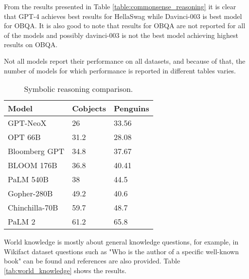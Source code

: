 \documentclass[conference]{IEEEtran}
\begin{document}
From the results presented in Table \ref{table:commonsense_reasoning} it is clear that GPT-4 achieves best results for HellaSwag while Davinci-003 is best model for OBQA. It is also good to note that results for OBQA are not reported for all of the models and possibly davinci-003 is not the best model achieving highest results on OBQA.

Not all models report their performance on all datasets, and because of that, the number of models for which performance is reported in different tables varies.

\begin{table}[!ht]
    \centering
    \caption{Symbolic reasoning comparison.}
    \begin{tabular}{|l|l|l|}
    \hline
        Model & Cobjects & Penguins \\ \hline
        GPT-NeoX & 26 & 33.56\\ \hline
OPT 66B & 31.2 & 28.08\\ \hline
Bloomberg GPT & 34.8 & 37.67\\ \hline
BLOOM 176B & 36.8 & 40.41\\ \hline
PaLM 540B & 38 & 44.5\\ \hline
Gopher-280B & 49.2 & 40.6\\ \hline
Chinchilla-70B & 59.7 & 48.7\\ \hline
PaLM 2 & 61.2 & 65.8\\ \hline
    \end{tabular}
\end{table}





World knowledge is mostly about general knowledge questions, for example, in Wikifact dataset questions such as "Who is the author of a specific well-known book" can be found and references are also provided. Table \ref{tab:world_knowledge} shows the results.
\end{document}
